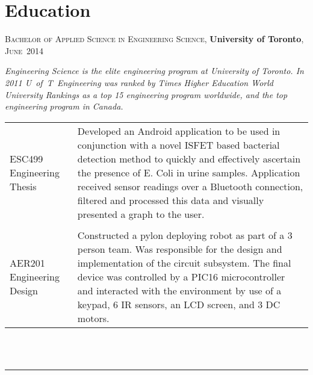 \documentclass[a4paper,10pt]{article}
\begin{document}

\section{Education}

\begin{minipage}{\linewidth} \textsc{Bachelor of Applied Science in Engineering Science}, \textbf{\mbox{University} of Toronto}, \mbox{\textsc{June} 2014} \\
 \footnotesize{\vspace*{-\baselineskip}\begin{center} \textit{Engineering Science is the elite engineering program at University of Toronto. In 2011 \mbox{U of T Engineering} was ranked by Times Higher Education World University Rankings as a top 15 engineering program worldwide, and the top engineering program in Canada.\\}\end{center}}
\vspace{1ex}
\begin{tabular}{m{2.5cm}|m{13cm}}
\begin{flushright}\normalsize{ESC499 Engineering Thesis} \end{flushright} & \footnotesize{Developed an Android application to be used in conjunction with a novel ISFET based bacterial detection method to quickly and effectively ascertain the presence of E. Coli in urine samples. Application received sensor readings over a Bluetooth connection, filtered and processed this data and visually presented a graph to the user.} \\
\multicolumn{2}{c}{} \\
\begin{flushright}\normalsize{AER201 \mbox{Engineering} Design} \end{flushright}& \footnotesize{ Constructed a pylon deploying robot as part of a 3 person team. Was responsible for the design and implementation of the circuit subsystem. The final device was
controlled by a PIC16 microcontroller and interacted with the environment by use of a keypad, 6 IR }
sensors, an LCD screen, and 3 DC motors. \\
\end{tabular}\end{minipage}\\ \\

\hrule
\end{document}

